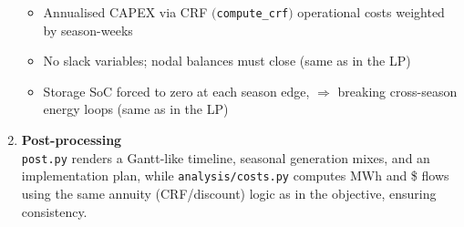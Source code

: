 \begin{enumerate}
\begin{itemize}
\begin{lstlisting}[language=Python]
      \end{lstlisting}
                      
                \item Annualised CAPEX via CRF \(\bigl(\)\texttt{compute\_crf}\(\bigr)\)
                      operational costs weighted by season-weeks
                \item No slack variables; nodal balances must close (same as in the LP)
                \item Storage SoC forced to zero at each season edge,
                      \(\Rightarrow\) breaking cross-season energy loops (same as in the LP)
            \end{itemize}

      \item \textbf{Post-processing}\\  
            \texttt{post.py} renders a Gantt-like timeline, seasonal
                  generation mixes, and an implementation plan, while
            \texttt{analysis/costs.py} computes MWh and
                  \$ flows using the same annuity (CRF/discount) logic as
                  in the objective, ensuring consistency.
\end{enumerate}

